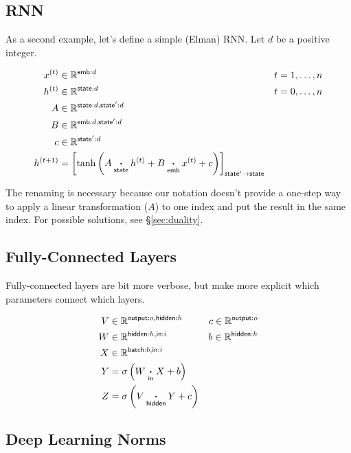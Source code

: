 \documentclass{article}
\newcommand{\name}[1]{\mathsf{#1}}
\newcommand{\nset}[2]{\name{#1}:#2}
\newcommand{\ndot}[1]{\mathbin{\mathop{\thinspace\boldsymbol\cdot\thinspace}\limits_{\name{#1}}}}
\newcommand{\nmov}[3]{\left[#3\right]_{\name{#1}\rightarrow\name{#2}}}
\newcommand{\reals}{\mathbb{R}}
\begin{document}
\subsection{RNN}
\label{sec:rnn}

As a second example, let's define a simple (Elman) RNN. Let $d$ be a positive integer.

\begin{align*}
x^{(t)} &\in \mathbb{R}^{\nset{emb}{d}} & t &= 1, \ldots, n \\
h^{(t)} &\in \mathbb{R}^{\nset{state}{d}} & t &= 0, \ldots, n\\
A &\in \mathbb{R}^{\nset{state}{d}, \nset{state'}{d}} \\
B &\in \mathbb{R}^{\nset{emb}{d}, \nset{state'}{d}} \\
c &\in \mathbb{R}^{\nset{state'}{d}} \\
h^{(t+1)} &= \nmov{state'}{state}{\tanh\left( A \ndot{state} h^{(t)} + B \ndot{emb} x^{(t)} + c \right)}
\end{align*}

The renaming is necessary because our notation doesn't provide a one-step way to apply a linear transformation ($A$) to one index and put the result in the same index. For possible solutions, see \S\ref{sec:duality}.

\subsection{Fully-Connected Layers}

Fully-connected layers are bit more verbose, but make more explicit which parameters connect which layers.

\begin{align*} 
V &\in \reals^{\nset{output}{o}, \nset{hidden}{h}} & c\in \reals^{\nset{output}{o}} \\
W &\in \reals^{{\nset{hidden}{h}, \nset{in}{i}}} & b \in \reals^{\nset{hidden}{h}} \\
X &\in \reals^{{\nset{batch}{b}, \nset{in}{i}}} \\
Y &= \sigma \left( W \ndot{in} X + b \right) \\
Z &= \sigma \left( V \ndot{hidden} Y + c \right)  
\end{align*}

\subsection{Deep Learning Norms}
\end{document}
